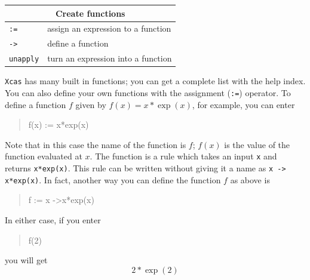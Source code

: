 \documentclass{article}
\newcommand{\xcasin}[1]
{\begin{quote}\ttfamily
#1
\end{quote}}
\newcommand{\xcasout}[1]
{\begin{equation*}
#1
\end{equation*}}
\begin{document}

\begin{center}
\begin{tabular}{|p{}|p{}|}
\hline
\multicolumn{2}{|c|}{\textbf{Create functions}}\\
\hline\hline
\texttt{:=} & assign an expression to a function\\
\texttt{->}  &  define a function\\
\texttt{unapply}   & turn an expression into a function\\
\hline
\end{tabular}
\end{center}

\texttt{Xcas} has many built in functions; you can get a complete list
with the help index.  You can also define your own functions with the
assignment (\texttt{:=}) operator.
To define a function $f$ given by $f(x) = x*\exp(x)$, for example, you
can enter 
\xcasin{f(x) := x*exp(x)}
Note that in this case the name of the function is $f$; $f(x)$ is the
value of the function evaluated at $x$.  The function is a rule which
takes an input \texttt{x} and returns \texttt{x*exp(x)}.  This rule
can be written without giving it a name as \texttt{x -> x*exp(x)}.  In
fact, another way you can define the function $f$ as above is
\xcasin{f := x ->x*exp(x)}
In either case, if you enter
\xcasin{f(2)}
you will get
\xcasout{2*\exp(2)}
\end{document}
